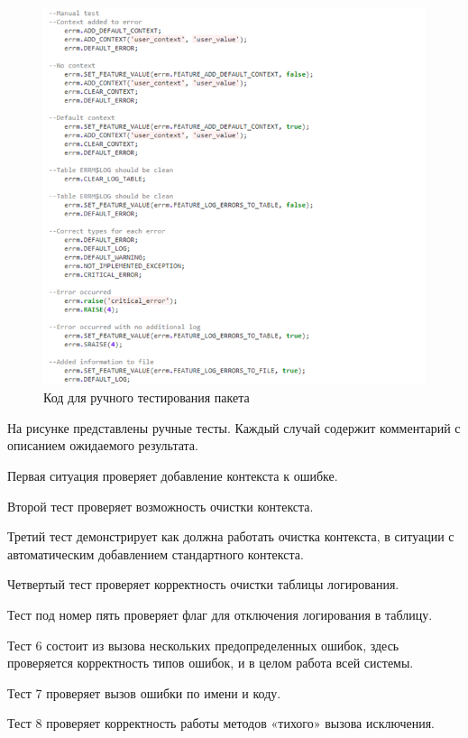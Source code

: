 \begin{figure}[ht!] 
	\center
	\includegraphics [scale=1] {my_folder/img/c4_manual_test.png}
	\caption{Код для ручного тестирования пакета} 
	\label{fig:c4_manual_test}  
\end{figure}
\FloatBarrier

На рисунке  представлены ручные тесты. Каждый случай содержит комментарий с описанием ожидаемого результата.

Первая ситуация проверяет добавление контекста к ошибке.
 
Второй тест проверяет возможность очистки контекста. 

Третий тест демонстрирует как должна работать очистка контекста, в ситуации с автоматическим добавлением стандартного контекста. 

Четвертый тест проверяет корректность очистки таблицы логирования.

Тест под номер пять проверяет флаг для отключения логирования в таблицу. 

Тест 6 состоит из вызова нескольких предопределенных ошибок, здесь проверяется корректность типов ошибок, и в целом работа всей системы.

Тест 7 проверяет вызов ошибки по имени и коду.

Тест 8 проверяет корректность работы методов «тихого» вызова исключения. 

